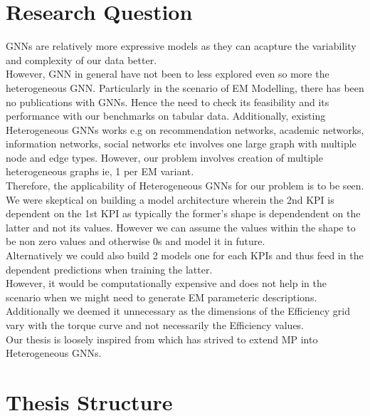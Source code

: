 \documentclass{report} %
\begin{document}
\section{Research Question}\label{sec:Research Question}
\ac{GNN}s are relatively more expressive models as they can acapture the variability and complexity of our data better.\\
However, \ac{GNN} in general have not been to less explored even so more the heterogeneous \ac{GNN}.
Particularly in the scenario of \ac{EM} Modelling, there has been no publications with \ac{GNN}s.
Hence the need to check its feasibility and its performance with our benchmarks on tabular data.
Additionally, existing Heterogeneous \ac{GNN}s works e.g on recommendation networks, academic networks, information networks, social networks etc involves one large graph with multiple node and edge types. 
However, our problem involves creation of multiple heterogeneous graphs ie, 1 per \ac{EM} variant.\\
Therefore, the applicability of Heterogeneous \ac{GNN}s for our problem is to be seen.\\

We were skeptical on building a model architecture wherein the 2nd KPI is dependent on the 1st KPI as typically the former's shape is dependendent on the latter and not its values.
However we can assume the values within the shape to be non zero values and otherwise 0s and model it in future.\\

Alternatively we could also build 2 models one for each KPIs and thus feed in the dependent predictions when training the latter. \\
However, it would be computationally expensive and does not help in the scenario when we might need to generate \ac{EM} parameteric descriptions.
Additionally we deemed it unnecessary as the dimensions of the Efficiency grid vary with the torque curve and not necessarily the Efficiency values. \\

Our thesis is loosely inspired from \cite{ML HGNN-2023} which has strived to extend \ac{MP} into Heterogeneous \ac{GNN}s.\\

\section{Thesis Structure}\label{sec:Thesis Structure}
\end{document}
